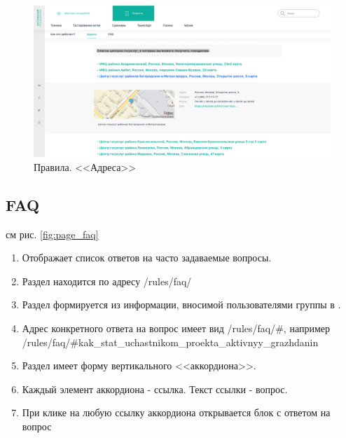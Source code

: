         \begin{figure}
            \includegraphics[width=170mm]{02_noauth_funcs/figures/10.eps}
            \caption{Правила. <<Адреса>>}
            \label{fig:page_address}
        \end{figure} 
            
        \subsection{FAQ}
            \label{sec:page_faq}
            
            см рис. \ref{fig:page_faq}

            \begin{enumerate}
                \item Отображает список ответов на часто задаваемые вопросы.
                \item Раздел находится по адресу /rules/faq/
                \item Раздел формируется из информации, вносимой 
                    пользователями группы  в .
                \item Адрес конкретного ответа на вопрос имеет вид 
                    /rules/faq/\#<транслит вопроса>, например 
             /rules/faq/\#kak\_stat\_uchastnikom\_proekta\_aktivnyy\_grazhdanin
                \item Раздел имеет форму вертикального <<аккордиона>>. 
                \item Каждый элемент аккордиона - ссылка. Текст ссылки - 
                    вопрос.
                \item При клике на любую ссылку аккордиона открывается блок 
                    с ответом на вопрос
            \end{enumerate}
            

